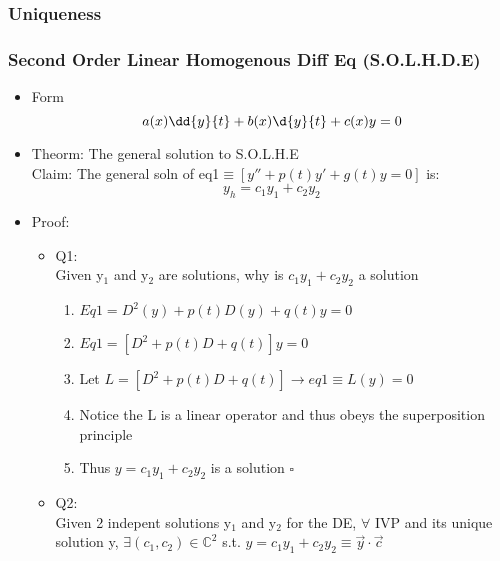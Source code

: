 \documentclass[11pt]{article}
\begin{document}
\subsubsection{Uniqueness}
\label{sec-9-2-3}
\subsubsection{Second Order Linear Homogenous Diff Eq (S.O.L.H.D.E)}
\label{sec-9-2-4}
\begin{itemize}

\item Form\\
\label{sec-9-2-4-1}%
\begin{equation}
     a(x)\dd{y}{t} + b(x)\d{y}{t} + c(x)y=0
     \end{equation}

\item Theorm: The general solution to S.O.L.H.E\\
\label{sec-9-2-4-2}%
Claim: The general soln of eq1$\equiv [y''+p(t)y'+g(t)y=0]$ is:
     \begin{equation}
     y_h=c_1y_1+c_2 y_2
     \end{equation}

\item Proof:
\label{sec-9-2-4-3}%
\begin{itemize}

\item Q1:\\
\label{sec-9-2-4-3-1}%
Given y$_1$ and y$_2$ are solutions, why is $c_1y_1+c_2y_2$ a solution
\begin{enumerate}
\item $Eq1=D^2(y)+p(t)D(y)+q(t)y=0$
\item $Eq1=[D^2+p(t)D+q(t)]y=0$
\item Let $L=[D^2+p(t)D+q(t)]\rightarrow eq1\equiv L(y)=0$
\item Notice the L is a linear operator and thus obeys the
            superposition principle
\item Thus $y = c_1 y_1 +c_2 y_2$ is a solution $\square$
\end{enumerate}

\item Q2:\\
\label{sec-9-2-4-3-2}%
Given 2 indepent solutions y$_1$ and y$_2$ for the DE, $\forall$ IVP and its unique solution y, $\exists (c_1,c_2)
         \in \mathbb{C}^2$ s.t. $y=c_1y_1 + c_2y_2 \equiv \vec{y}\cdot\vec{c}$



\end{itemize}
\end{itemize}
\end{document}
